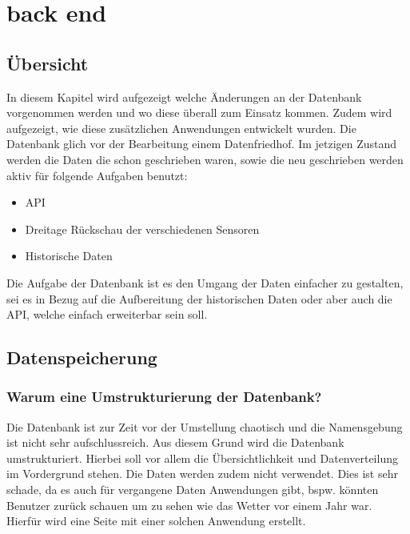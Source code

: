 \section{back end}


\subsection{Übersicht}

In diesem Kapitel wird aufgezeigt welche Änderungen an der Datenbank vorgenommen werden und wo diese überall zum Einsatz kommen. Zudem wird aufgezeigt, wie diese zusätzlichen Anwendungen entwickelt wurden. Die Datenbank glich vor der Bearbeitung einem Datenfriedhof. Im jetzigen Zustand werden die Daten die schon geschrieben waren, sowie die neu geschrieben werden aktiv für folgende Aufgaben benutzt:\\
\begin{itemize}
\item API
\item Dreitage Rückschau der verschiedenen Sensoren
\item Historische Daten
\end{itemize}

Die Aufgabe der Datenbank ist es den Umgang der Daten einfacher zu gestalten, sei es in Bezug auf die Aufbereitung der historischen Daten oder aber auch die API, welche einfach erweiterbar sein soll. 


\subsection{Datenspeicherung}
\subsubsection{Warum eine Umstrukturierung der Datenbank?}
Die Datenbank ist zur Zeit vor der Umstellung chaotisch und die Namensgebung ist nicht sehr aufschlussreich. Aus diesem Grund wird die Datenbank umstrukturiert. Hierbei soll vor allem die Übersichtlichkeit und Datenverteilung im Vordergrund stehen. Die Daten werden zudem nicht verwendet. Dies ist sehr schade, da es auch für vergangene Daten Anwendungen gibt, bspw. könnten Benutzer zurück schauen um zu sehen wie das Wetter vor einem Jahr war. Hierfür wird eine Seite mit einer solchen Anwendung erstellt.

